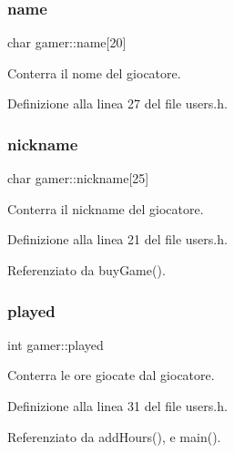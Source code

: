 \mbox{\label{structgamer_a0cd218f98cf7a26401782bcca0fa653e}} 
\subsubsection{\texorpdfstring{name}{name}}
{\footnotesize\ttfamily char gamer\+::name\mbox{[}20\mbox{]}}



Conterra\textquotesingle{} il nome del giocatore. 



Definizione alla linea 27 del file users.\+h.

\mbox{\label{structgamer_add226e4468980412981fd8ee76f61d85}} 
\subsubsection{\texorpdfstring{nickname}{nickname}}
{\footnotesize\ttfamily char gamer\+::nickname\mbox{[}25\mbox{]}}



Conterra\textquotesingle{} il nickname del giocatore. 



Definizione alla linea 21 del file users.\+h.



Referenziato da buy\+Game().

\mbox{\label{structgamer_a61d06d292744f84b81e6f2491948d931}} 
\subsubsection{\texorpdfstring{played}{played}}
{\footnotesize\ttfamily int gamer\+::played}



Conterra\textquotesingle{} le ore giocate dal giocatore. 



Definizione alla linea 31 del file users.\+h.



Referenziato da add\+Hours(), e main().

\mbox{\label{structgamer_a57053b3442e98353ebab5a051926c7d5}} 
